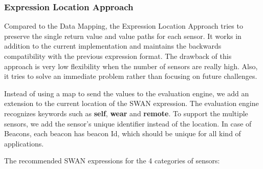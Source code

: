 
\subsubsection{Expression Location Approach} \label{sssec:exprlocation}
Compared to the Data Mapping, the  Expression Location Approach tries to preserve the single return value and value paths for each sensor.
It works in addition to the current implementation and maintains the backwards compatibility with the previous expression format.
The drawback of this approach is very low flexibility when the number of sensors are really high. Also, it tries to solve an immediate 
problem rather than focusing on future challenges.

Instead of using a map to send the values to the evaluation engine, we add an extension to the current location of the SWAN expression.
The evaluation engine recognizes keywords such as \textbf{self}, \textbf{wear} and \textbf{remote}. To support the multiple sensors, 
we add the sensor's unique identifier instead of the location. In case of Beacons, each beacon has beacon Id, which should be unique for 
all kind of applications.

The recommended SWAN expressions for the 4 categories of sensors:

